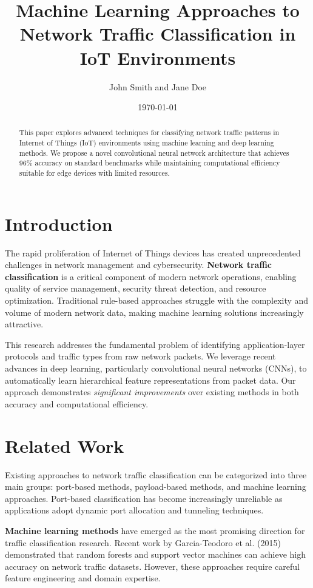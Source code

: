 \documentclass[12pt]{article}
\title{Machine Learning Approaches to Network Traffic Classification in IoT Environments}
\author{John Smith and Jane Doe}
\date{\today}
\begin{document}
\maketitle

\begin{abstract}
This paper explores advanced techniques for classifying network traffic patterns in Internet of Things (IoT) environments using machine learning and deep learning methods. We propose a novel convolutional neural network architecture that achieves 96\% accuracy on standard benchmarks while maintaining computational efficiency suitable for edge devices with limited resources.
\end{abstract}

\section{Introduction}

The rapid proliferation of Internet of Things devices has created unprecedented challenges in network management and cybersecurity. \textbf{Network traffic classification} is a critical component of modern network operations, enabling quality of service management, security threat detection, and resource optimization. Traditional rule-based approaches struggle with the complexity and volume of modern network data, making machine learning solutions increasingly attractive.

This research addresses the fundamental problem of identifying application-layer protocols and traffic types from raw network packets. We leverage recent advances in deep learning, particularly convolutional neural networks (CNNs), to automatically learn hierarchical feature representations from packet data. Our approach demonstrates \textit{significant improvements} over existing methods in both accuracy and computational efficiency.

\section{Related Work}

Existing approaches to network traffic classification can be categorized into three main groups: port-based methods, payload-based methods, and machine learning approaches. Port-based classification has become increasingly unreliable as applications adopt dynamic port allocation and tunneling techniques.

\textbf{Machine learning methods} have emerged as the most promising direction for traffic classification research. Recent work by Garcia-Teodoro et al. (2015) demonstrated that random forests and support vector machines can achieve high accuracy on network traffic datasets. However, these approaches require careful feature engineering and domain expertise.
\end{document}
